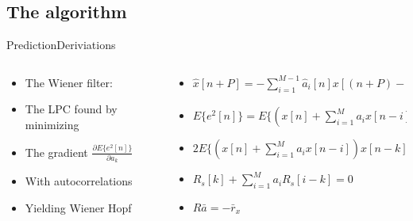 \subsection{The algorithm}
\begin{frame}{Prediction}{Deriviations}
	\begin{columns}
		\begin{column}{0.45\textwidth}
			\begin{itemize}
				\item The Wiener filter: 
				\vspace{3mm}
				\item The LPC found by minimizing 
				\vspace{3mm}
				\item The gradient $\frac{\partial E\{e^2[n]\}}{\partial a_k}$
				\vspace{3mm}
				\item With autocorrelations
				\vspace{3mm}
				\item Yielding Wiener Hopf				
			\end{itemize}
		\end{column}
		\begin{column}{0.55\textwidth} 
			\begin{itemize}
				\item[] $\hat{x}[n+P] =- \sum^{M-1}_{i=1}\hat{a}_i[n]x[(n+P)-i]$
				\vspace{3mm}
				\item[] $E\{e^2[n]\}=E\{(x[n]+\sum_{i=1}^{M}a_ix[n-i] )^2\}$
				\vspace{3mm}
				\item[] $2E\{(x[n]+\sum_{i=1}^{M}a_ix[n-i] )x[n-k]\}=0$
				\vspace{3mm}
				\item[] $R_s[k]+\sum_{i=1}^{M}a_iR_s[i-k]=0$
				\vspace{3mm}
				\item[] $R  \bar{a} = -\bar{r}_x$
			\end{itemize}		
		\end{column}
	\end{columns}
\end{frame}

